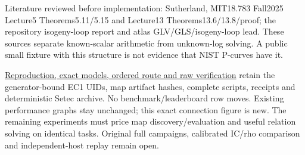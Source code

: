 \documentclass[
  10pt,
]{article}
\begin{document}
Literature reviewed before implementation: Sutherland, MIT18.783
Fall2025 Lecture5 Theorems5.11/5.15 and Lecture13
Theorems13.6/13.8/proof; the repository isogeny-loop report and atlas
GLV/GLS/isogeny-loop lead. These sources separate known-scalar
arithmetic from unknown-log solving. A public small fixture with this
structure is not evidence that NIST P-curves have it.

\href{../../execution-v10/README.md}{Reproduction, exact models, ordered
route and raw verification} retain the generator-bound EC1 UIDs, map
artifact hashes, complete scripts, receipts and deterministic Setec
archive. No benchmark/leaderboard row moves. Existing performance graphs
stay unchanged; this exact connection figure is new. The remaining
experiments must price map discovery/evaluation and useful relation
solving on identical tasks. Original full campaigns, calibrated IC/rho
comparison and independent-host replay remain open.
\end{document}
